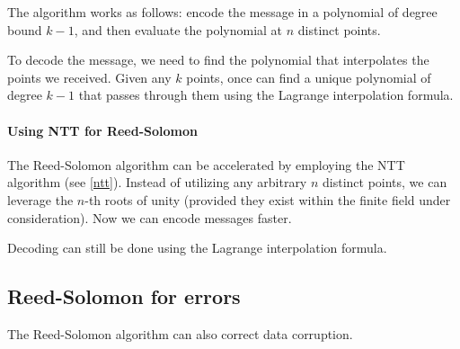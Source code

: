 The algorithm works as follows:
encode the message in a polynomial of degree bound $k-1$,
and then evaluate the polynomial at $n$ distinct points.

To decode the message, we need to find the polynomial that interpolates the points we received.
Given any $k$ points, once can find a unique polynomial of degree $k-1$ that passes through them
using the Lagrange interpolation formula.


\paragraph{Using NTT for Reed-Solomon} 
The Reed-Solomon algorithm can be accelerated by employing the NTT algorithm (see \autoref{ntt}).
Instead of utilizing any arbitrary $n$ distinct points, we can leverage the $n$-th 
roots of unity (provided they exist within the finite field under consideration).
Now we can encode messages faster.

Decoding can still be done using the Lagrange interpolation formula.


\subsection{Reed-Solomon for errors}
The Reed-Solomon algorithm can also correct data corruption.









